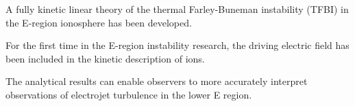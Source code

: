 \documentclass[draft]{agujournal2019}
\begin{document}

\begin{keypoints}
\item A fully kinetic linear theory of the thermal Farley-Buneman instability (TFBI) in the E-region ionosphere has been developed.
\item For the first time in the E-region instability %
research, the driving electric field has been included in the kinetic description of ions.
\item The analytical results can enable observers to more accurately interpret observations of electrojet turbulence in the lower E region.
\end{keypoints}

%
%

%
%

\end{document}

